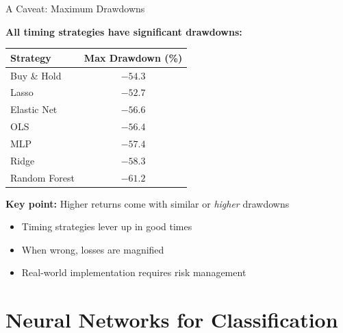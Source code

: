 \documentclass[10pt]{beamer}
\begin{document}
\begin{frame}{A Caveat: Maximum Drawdowns}

  \textbf{All timing strategies have significant drawdowns:}

  \vspace{0.5em}
  \begin{center}
  \begin{tabular}{lc}
    \toprule
    \textbf{Strategy} & \textbf{Max Drawdown (\%)} \\
    \midrule
    Buy \& Hold & $-54.3$ \\
    \midrule
    Lasso & $-52.7$ \\
    Elastic Net & $-56.6$ \\
    OLS & $-56.4$ \\
    MLP & $-57.4$ \\
    Ridge & $-58.3$ \\
    Random Forest & $-61.2$ \\
    \bottomrule
  \end{tabular}
  \end{center}

  \vspace{0.5em}
  \textbf{Key point:} Higher returns come with similar or \textit{higher} drawdowns
  \begin{itemize}
    \item Timing strategies lever up in good times
    \item When wrong, losses are magnified
    \item Real-world implementation requires risk management
  \end{itemize}
\end{frame}

\section{Neural Networks for Classification}
\end{document}
